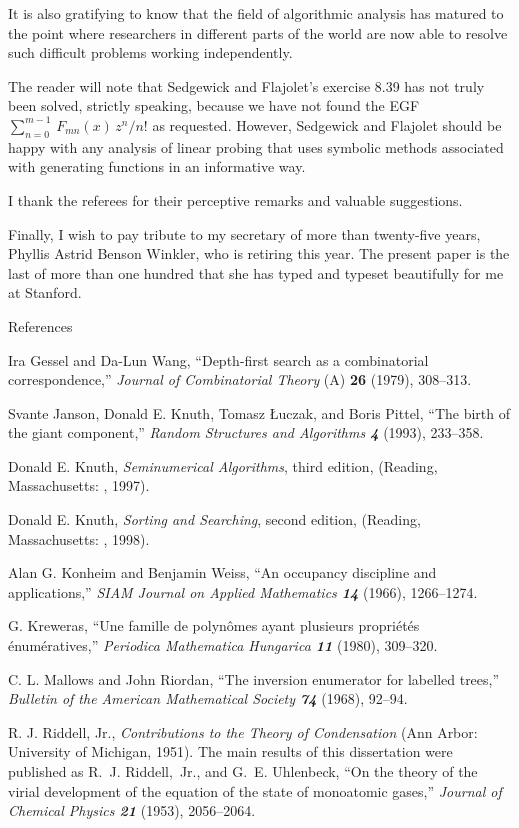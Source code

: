 It is also gratifying to know that the field of algorithmic analysis has
matured to the point where researchers in different parts of the world are
now able to resolve such difficult problems working independently.

The reader will note that Sedgewick and Flajolet's exercise 8.39 has not
truly been solved, strictly speaking, because we have not found the EGF
$\sum_{n=0}^{m-1}\,F_{mn}(x)\,z^n\!/n!$ as requested. However, Sedgewick
and Flajolet should be happy with any analysis of linear probing that uses
symbolic methods associated with generating functions in an informative
way.

I thank the referees for their perceptive remarks and valuable suggestions.

Finally, I wish to pay tribute to my secretary of more than twenty-five
years, Phyllis Astrid Benson Winkler, who is retiring this year. The
present paper is the last of more than one hundred that she has typed and
typeset beautifully for me at Stanford.

\bigskip
\centerline{References}

\smallskip
\bib
[\GW]
Ira Gessel and Da-Lun Wang, ``Depth-first search as a combinatorial
correspondence,'' {\sl Journal of Combinatorial Theory\/} (A) {\bf 26}
(1979), 308--313.

\smallskip
\bib
[\JKLP]
Svante Janson, Donald E. Knuth, Tomasz {\L}uczak, and Boris Pittel, ``The
birth of the giant component,'' {\sl Random Structures and Algorithms\/ \bf
4} (1993), 233--358.

\smallskip
\bib
[\Kii]
Donald E. Knuth, {\sl Seminumerical Algorithms}, third edition, 
(Reading, Massachusetts: \AW, 1997).

\smallskip
\bib
[\Kiii] Donald E. Knuth, {\sl Sorting and Searching}, second edition,
(Reading, Massachusetts: \AW, 1998).

\smallskip
\bib
[\KW]
Alan G. Konheim and Benjamin Weiss, ``An occupancy discipline and
applications,'' {\sl SIAM Journal on Applied Mathematics\/ \bf 14} (1966),
1266--1274.

\smallskip
\bib
[\Kr]
G. Kreweras, ``Une famille de polyn\^omes ayant plusieurs propri\'et\'es
\'enum\'eratives,'' {\sl Periodica Mathematica Hungarica\/ \bf 11}
 (1980), 309--320.

\smallskip
\bib
[\MR]
C. L. Mallows and John Riordan, ``The inversion enumerator for labelled
trees,'' {\sl Bulletin of the American Mathematical Society\/ \bf 74}
(1968), 92--94.

\smallskip
\bib
[\R]
R. J. Riddell, Jr., {\sl Contributions to the Theory of Condensation\/}
(Ann Arbor: University of Michigan, 1951). The main results of this
dissertation were published as R.~J. Riddell,~Jr., and G.~E. Uhlenbeck,
``On the theory of the virial development of the equation of the state of
monoatomic gases,'' {\sl Journal of Chemical Physics\/ \bf 21} (1953),
2056--2064. 

